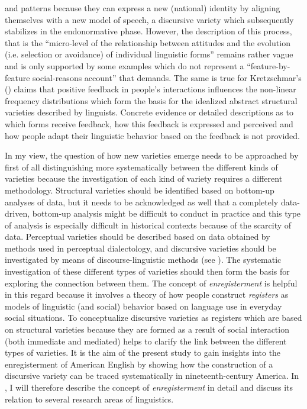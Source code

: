 and patterns because they can express a new (national) identity by aligning themselves with a new model of speech, a discursive variety which subsequently stabilizes in the endonormative phase. However, the description of this process, that is the “micro-level of the relationship between attitudes and the evolution (i.e. selection or avoidance) of individual linguistic forms” \citep[95]{Schneider2007} remains rather vague and is only supported by some examples which do not represent a “feature-by-feature social-reasons account” that \citet{Trudgill2008b} demands. The same is true for Kretzschmar’s (\citeyear{Kretzschmar2014, Kretzschmar2015}) claims that positive feedback in people’s interactions influences the non-linear frequency distributions which form the basis for the idealized abstract structural varieties described by linguists. Concrete evidence or detailed descriptions as to which forms receive feedback, how this feedback is expressed and perceived and how people adapt their linguistic behavior based on the feedback is not provided.

In my view, the question of how new varieties emerge needs to be approached by first of all distinguishing more systematically between the different kinds of varieties because the investigation of each kind of variety requires a different methodology. Structural varieties should be identified based on bottom-up analyses of data, but it needs to be acknowledged as well that a completely data-driven, bottom-up analysis might be difficult to conduct in practice and this type of analysis is especially difficult in historical contexts because of the scarcity of data. Perceptual varieties should be described based on data obtained by methods used in perceptual dialectology, and discursive varieties should be investigated by means of discourse-linguistic methods (see ). The systematic investigation of these different types of varieties should then form the basis for exploring the connection between them. The concept of \textit{enregisterment} is helpful in this regard because it involves a theory of how people construct \textit{registers} as models of linguistic (and social) behavior based on language use in everyday social situations. To conceptualize discursive varieties as registers which are based on structural varieties because they are formed as a result of social interaction (both immediate and mediated) helps to clarify the link between the different types of varieties. It is the aim of the present study to gain insights into the enregisterment of American English by showing how the construction of a discursive variety can be traced systematically in nineteenth-century America. In , I will therefore describe the concept of \textit{enregisterment} in detail and discuss its relation to several research areas of linguistics.

